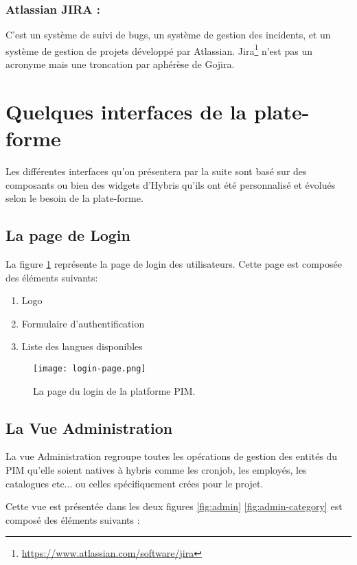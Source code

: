 \subsubsection{Atlassian JIRA :} C'est un système de suivi de bugs, un système de gestion des incidents, et un système de gestion de projets développé par Atlassian. Jira\footnote{\url{https://www.atlassian.com/software/jira}} n'est pas un acronyme mais une troncation par aphérèse de Gojira\cite{wiki:jira}.

\section{Quelques interfaces de la plate-forme}
Les différentes interfaces qu'on présentera par la suite sont basé sur des composants ou bien des widgets d'Hybris qu'ils ont été personnalisé et évolués selon le besoin de la plate-forme.

\subsection{La page de Login}
La figure \ref{fig:login}  représente la page de login des utilisateurs. Cette page est composée des éléments suivants:
\medskip
\begin{enumerate}
    \item Logo
    \smallskip
    \item Formulaire d'authentification
    \smallskip
    \item Liste des langues disponibles
\end{enumerate}
\medskip

\begin{figure}[ht]
  \centering
  \texttt{[image: login-page.png]}
  \caption{La page du login de la platforme PIM.}
  \label{fig:login}
\end{figure}
\FloatBarrier


\subsection{La Vue Administration}

La vue Administration regroupe toutes les opérations de gestion des entités du PIM qu'elle soient natives à hybris comme les cronjob, les employés, les catalogues etc... ou celles spécifiquement crées pour le projet.
\bigskip

Cette vue est présentée dans les deux figures \ref{fig:admin} \ref{fig:admin-category} est composé des éléments suivants :

